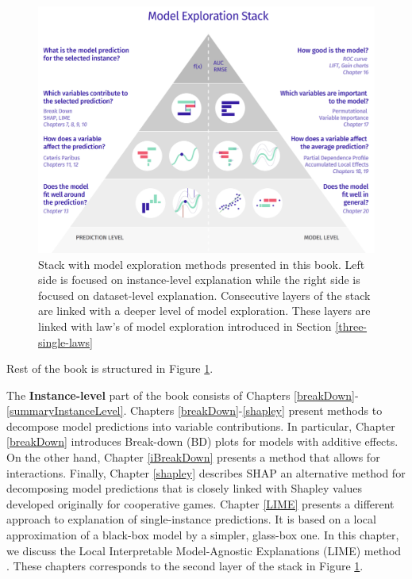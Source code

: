 \documentclass[12pt,]{krantz}
\begin{document}
\begin{figure}

{\centering \includegraphics[width=0.85\linewidth]{figure/UMEPpiramide} 

}

\caption{Stack with model exploration methods presented in this book. Left side is focused on instance-level explanation while the right side is focused on dataset-level explanation. Consecutive layers of the stack are linked with a deeper level of model exploration. These layers are linked with law's of model exploration introduced in Section \ref{three-single-laws}}\label{fig:UMEPpiramide}
\end{figure}

Rest of the book is structured in Figure \ref{fig:UMEPpiramide}.

The \textbf{Instance-level} part of the book consists of Chapters \ref{breakDown}-\ref{summaryInstanceLevel}.
Chapters \ref{breakDown}-\ref{shapley} present methods to decompose model predictions into variable contributions. In particular, Chapter \ref{breakDown} introduces Break-down (BD) plots for models with additive effects. On the other hand, Chapter \ref{iBreakDown} presents a method that allows for interactions. Finally, Chapter \ref{shapley} describes SHAP \citep{SHAP} an alternative method for decomposing model predictions that is closely linked with Shapley values \citep{shapleybook1952} developed originally for cooperative games.
Chapter \ref{LIME} presents a different approach to explanation of single-instance predictions. It is based on a local approximation of a black-box model by a simpler, glass-box one. In this chapter, we discuss the Local Interpretable Model-Agnostic Explanations (LIME) method \citep{lime}. These chapters corresponds to the second layer of the stack in Figure \ref{fig:UMEPpiramide}.
\end{document}
